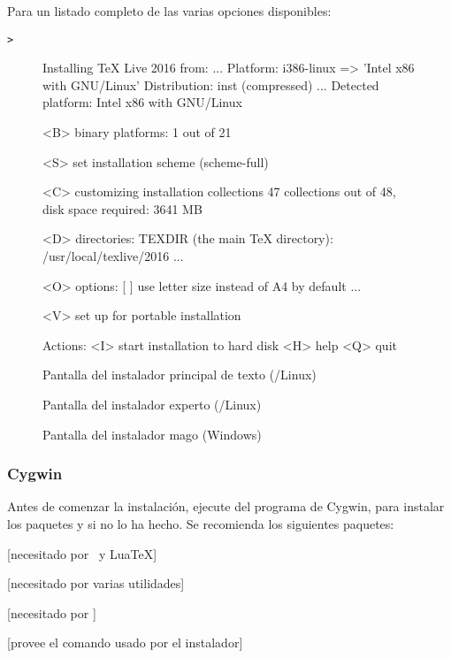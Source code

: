 \documentclass{article}
\begin{document}
Para un listado completo de las varias opciones disponibles:
\begin{alltt}
	> 
\end{alltt}

\begin{figure}[tb]
	\begin{boxedverbatim}
Installing TeX Live 2016 from: ...
Platform: i386-linux => 'Intel x86 with GNU/Linux'
Distribution: inst (compressed)
...
 Detected platform: Intel x86 with GNU/Linux
 
 <B> binary platforms: 1 out of 21

 <S> set installation scheme (scheme-full)

 <C> customizing installation collections
     47 collections out of 48, disk space required: 3641 MB

 <D> directories:
   TEXDIR (the main TeX directory):
     /usr/local/texlive/2016
   ...

 <O> options:
   [ ] use letter size instead of A4 by default
   ...
 
 <V> set up for portable installation

Actions:
 <I> start installation to hard disk
 <H> help
 <Q> quit
\end{boxedverbatim}
\caption{Pantalla del instalador principal de texto (\GNU/Linux)}\label{fig:text-main}
\end{figure}

\begin{figure}[tb]
\caption{Pantalla del instalador experto \GUI{} (\GNU/Linux)}\label{fig:gui-main}
\end{figure}

\begin{figure}[tb]
\caption{Pantalla del instalador mago (Windows)}\label{fig:wizard-w32}
\end{figure}

\subsubsection{Cygwin}
\label{sec:cygwin}

Antes de comenzar la instalación, ejecute  del
programa de Cygwin, para instalar los paquetes  y
 si no lo ha hecho. Se recomienda los siguientes
paquetes:
\begin{itemize*}
	\item {}[necesitado por \XeTeX\ y Lua\TeX]
	\item {} [necesitado por varias utilidades]
	\item {} [necesitado por ]
	\item {} [provee el comando  usado por el instalador]
\end{itemize*}
\end{document}

